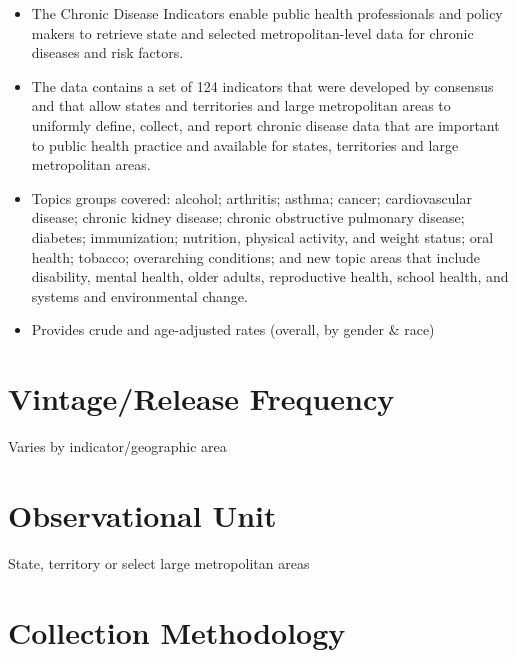 \documentclass[
]{book}
\providecommand{\tightlist}{%
  \setlength{\itemsep}{0pt}\setlength{\parskip}{0pt}}
\begin{document}
\begin{itemize}
\tightlist
\item
  The Chronic Disease Indicators enable public health professionals and policy makers to retrieve state and selected metropolitan-level data for chronic diseases and risk factors.
\item
  The data contains a set of 124 indicators that were developed by consensus and that allow states and territories and large metropolitan areas to uniformly define, collect, and report chronic disease data that are important to public health practice and available for states, territories and large metropolitan areas.
\item
  Topics groups covered: alcohol; arthritis; asthma; cancer; cardiovascular disease; chronic kidney disease; chronic obstructive pulmonary disease; diabetes; immunization; nutrition, physical activity, and weight status; oral health; tobacco; overarching conditions; and new topic areas that include disability, mental health, older adults, reproductive health, school health, and systems and environmental change.
\item
  Provides crude and age-adjusted rates (overall, by gender \& race)
\end{itemize}

\hypertarget{vintagerelease-frequency-15}{%
\section{Vintage/Release Frequency}\label{vintagerelease-frequency-15}}

Varies by indicator/geographic area

\hypertarget{observational-unit-15}{%
\section{Observational Unit}\label{observational-unit-15}}

State, territory or select large metropolitan areas

\hypertarget{collection-methodology-15}{%
\section{Collection Methodology}\label{collection-methodology-15}}
\end{document}

